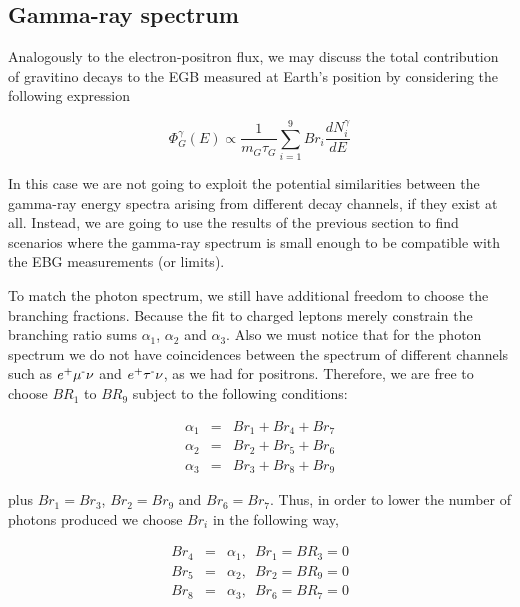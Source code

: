 \documentclass[a4paper,11pt]{article}
\begin{document}

\subsection{Gamma-ray spectrum}

Analogously to the electron-positron flux, we may discuss the total contribution of gravitino decays to the EGB measured at Earth's position by considering the following expression

\begin{equation}
\Phi_{G}^{\gamma}(E) \propto\frac{1}{m_{G}\tau_{G}}\sum_{i=1}^{9}Br_{i}\frac{dN^{\gamma}_{i}}{dE}
\end{equation}

In this case we are not going to exploit the potential similarities between the gamma-ray energy spectra arising from different decay channels, if they exist at all. Instead, we are going to use the results of the previous section to find scenarios where the gamma-ray spectrum is small enough to be compatible with the EBG measurements (or limits).

To match the photon spectrum, we still have additional freedom to choose the branching fractions. Because the fit to charged leptons merely constrain the branching ratio sums $\alpha_1$, $\alpha_2$ and $\alpha_3$. Also we must notice that for the photon spectrum we do not have coincidences
between the spectrum of different channels such as $e\text{\textsuperscript{+}}\mu\text{\textsuperscript{-}}\nu$
and $e\text{\textsuperscript{+}}\tau\text{\textsuperscript{-}}\nu$,
as we had for positrons. Therefore, we are free to choose $BR_{1}$
to $BR_{9}$ subject to the following conditions:

\begin{eqnarray*}
\alpha_{1} & = & Br_{1}+Br_{4}+Br_{7}\\
\alpha_{2} & = & Br_{2}+Br_{5}+Br_{6}\\
\alpha_{3} & = & Br_{3}+Br_{8}+Br_{9}
\end{eqnarray*}

\noindent plus $Br_1 = Br_3$, $Br_2 = Br_9$ and $Br_6 = Br_7$. Thus, in order to lower the number of photons produced we choose $Br_{i}$ in the following way,

\begin{eqnarray*}
Br_{4} & = & \alpha_{1},\,\,\,Br_{1}=BR_{3}=0\\
Br_{5} & = & \alpha_{2},\,\,\,Br_{2}=BR_{9}=0\\
Br_{8} & = & \alpha_{3},\,\,\,Br_{6}=BR_{7}=0
\end{eqnarray*}
\end{document}
